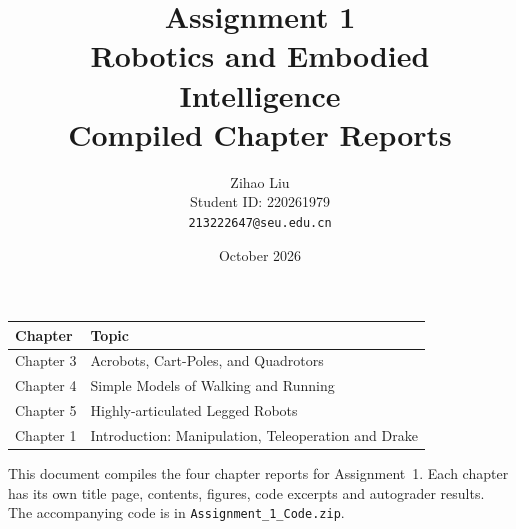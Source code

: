 \documentclass[11pt]{article}
\title{\textbf{Assignment 1}\\[6pt]
Robotics and Embodied Intelligence\\[4pt]
\large Compiled Chapter Reports}
\author{Zihao Liu\\[2pt]
Student ID: 220261979\\[2pt]
\texttt{213222647@seu.edu.cn}}
\date{October 2026}
\begin{document}
\maketitle
\vspace{1cm}
\begin{center}
\begin{tabular}{ll}
\toprule
Chapter & Topic \\
\midrule
Chapter 3 & Acrobots, Cart-Poles, and Quadrotors \\
Chapter 4 & Simple Models of Walking and Running \\
Chapter 5 & Highly-articulated Legged Robots \\
Chapter 1 & Introduction: Manipulation, Teleoperation and Drake \\
\bottomrule
\end{tabular}
\end{center}
\vspace{1cm}
\noindent
This document compiles the four chapter reports for Assignment~1.  Each
chapter has its own title page, contents, figures, code excerpts and
autograder results.  The accompanying code is in
\texttt{Assignment\_1\_Code.zip}.
\end{document}
